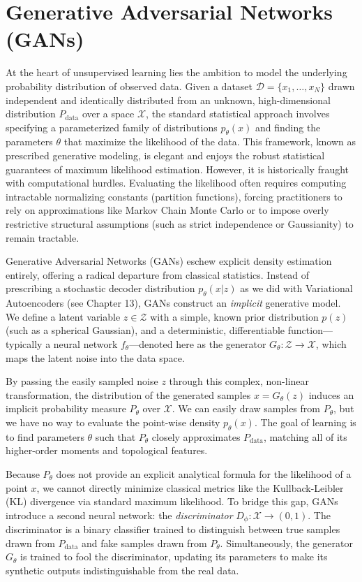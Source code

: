 \chapter{Generative Adversarial Networks (GANs)}
\label{ch:gan}

At the heart of unsupervised learning lies the ambition to model the underlying probability distribution of observed data. Given a dataset $\mathcal{D} = \{x_1, \dots, x_N\}$ drawn independent and identically distributed from an unknown, high-dimensional distribution $P_{\text{data}}$ over a space $\mathcal{X}$, the standard statistical approach involves specifying a parameterized family of distributions $p_\theta(x)$ and finding the parameters $\theta$ that maximize the likelihood of the data. This framework, known as prescribed generative modeling, is elegant and enjoys the robust statistical guarantees of maximum likelihood estimation. However, it is historically fraught with computational hurdles. Evaluating the likelihood often requires computing intractable normalizing constants (partition functions), forcing practitioners to rely on approximations like Markov Chain Monte Carlo or to impose overly restrictive structural assumptions (such as strict independence or Gaussianity) to remain tractable. 

Generative Adversarial Networks (GANs) eschew explicit density estimation entirely, offering a radical departure from classical statistics. Instead of prescribing a stochastic decoder distribution $p_\theta(x|z)$ as we did with Variational Autoencoders (see Chapter 13), GANs construct an \textit{implicit} generative model. We define a latent variable $z \in \mathcal{Z}$ with a simple, known prior distribution $p(z)$ (such as a spherical Gaussian), and a deterministic, differentiable function---typically a neural network $f_\theta$---denoted here as the generator $G_\theta : \mathcal{Z} \to \mathcal{X}$, which maps the latent noise into the data space. 

By passing the easily sampled noise $z$ through this complex, non-linear transformation, the distribution of the generated samples $x = G_\theta(z)$ induces an implicit probability measure $P_\theta$ over $\mathcal{X}$. We can easily draw samples from $P_\theta$, but we have no way to evaluate the point-wise density $p_\theta(x)$. The goal of learning is to find parameters $\theta$ such that $P_\theta$ closely approximates $P_{\text{data}}$, matching all of its higher-order moments and topological features.

Because $P_\theta$ does not provide an explicit analytical formula for the likelihood of a point $x$, we cannot directly minimize classical metrics like the Kullback-Leibler (KL) divergence via standard maximum likelihood. To bridge this gap, GANs introduce a second neural network: the \textit{discriminator} $D_\phi : \mathcal{X} \to (0, 1)$. The discriminator is a binary classifier trained to distinguish between true samples drawn from $P_{\text{data}}$ and fake samples drawn from $P_\theta$. Simultaneously, the generator $G_\theta$ is trained to fool the discriminator, updating its parameters to make its synthetic outputs indistinguishable from the real data.

